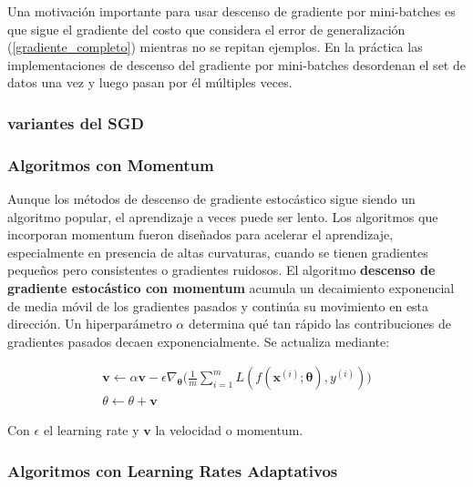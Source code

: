 Una motivaci\'on importante para usar descenso de gradiente por mini-batches es que sigue el gradiente del costo que considera el error de generalizaci\'on (\ref{gradiente_completo}) mientras no se repitan ejemplos. En la pr\'actica las implementaciones de descenso del gradiente por mini-batches desordenan el set de datos una vez y luego pasan por \'el m\'ultiples veces.

\subsubsection{variantes del SGD}

\subsubsection{Algoritmos con Momentum} %

Aunque los métodos de descenso de gradiente estoc\'astico sigue siendo un algoritmo popular, el aprendizaje a veces puede ser lento. Los algoritmos que incorporan momentum fueron dise{\~{n}}ados para acelerar el aprendizaje, especialmente en presencia de altas curvaturas, cuando se tienen gradientes peque{\~{n}}os pero consistentes o gradientes ruidosos. El algoritmo \textbf{descenso de gradiente estoc\'astico con momentum} acumula un decaimiento exponencial de media m\'ovil de los gradientes pasados y contin\'ua su movimiento en esta direcci\'on. Un hiperpar\'ametro $\alpha$ determina qu\'e tan r\'apido las contribuciones de gradientes pasados decaen exponencialmente. Se actualiza mediante:

\begin{gather*}
\bm{v} \longleftarrow \alpha\bm{v} - \epsilon\nabla_{\bm{\theta}}\Big(\frac{1}{m}\sum_{i=1}^{m}L(f(\bm{x}^{(i)};\bm{\theta}),y^{(i)})\Big)
\\
\theta \longleftarrow \theta + \bm{v}
\end{gather*}

Con $\epsilon$ el learning rate y $\bm{v}$ la velocidad o momentum.

\subsubsection{Algoritmos con Learning Rates Adaptativos} %

